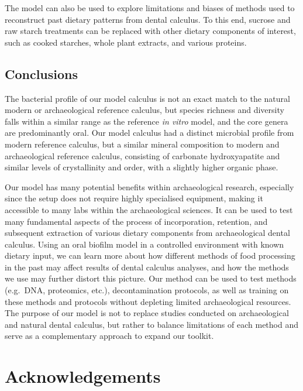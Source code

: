 \documentclass[10pt,a4paper]{article}
\begin{document}
The model can also be used to explore limitations and biases of methods
used to reconstruct past dietary patterns from dental calculus. To this
end, sucrose and raw starch treatments can be replaced with other
dietary components of interest, such as cooked starches, whole plant
extracts, and various proteins.

\subsection{Conclusions}\label{conclusions}

The bacterial profile of our model calculus is not an exact match to the
natural modern or archaeological reference calculus, but species
richness and diversity falls within a similar range as the reference
\emph{in vitro} model, and the core genera are predominantly oral. Our
model calculus had a distinct microbial profile from modern reference
calculus, but a similar mineral composition to modern and archaeological
reference calculus, consisting of carbonate hydroxyapatite and similar
levels of crystallinity and order, with a slightly higher organic phase.

Our model has many potential benefits within archaeological research,
especially since the setup does not require highly specialised
equipment, making it accessible to many labs within the archaeological
sciences. It can be used to test many fundamental aspects of the process
of incorporation, retention, and subsequent extraction of various
dietary components from archaeological dental calculus. Using an oral
biofilm model in a controlled environment with known dietary input, we
can learn more about how different methods of food processing in the
past may affect results of dental calculus analyses, and how the methods
we use may further distort this picture. Our method can be used to test
methods (e.g.~DNA, proteomics, etc.), decontamination protocols, as well
as training on these methods and protocols without depleting limited
archaeological resources. The purpose of our model is not to replace
studies conducted on archaeological and natural dental calculus, but
rather to balance limitations of each method and serve as a
complementary approach to expand our toolkit.

\section*{Acknowledgements}\label{acknowledgements}
\end{document}
